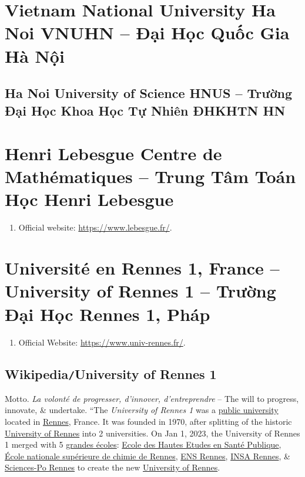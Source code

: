 \documentclass{article}
\begin{document}
\section{Vietnam National University Ha Noi VNUHN -- Đại Học Quốc Gia Hà Nội}

\subsection{Ha Noi University of Science HNUS -- Trường Đại Học Khoa Học Tự Nhiên ĐHKHTN HN}


\section{Henri Lebesgue Centre de Math\'ematiques -- Trung Tâm Toán Học Henri Lebesgue}
\begin{enumerate}
	\item Official website: \url{https://www.lebesgue.fr/}.
\end{enumerate}


\section{Universit\'e en Rennes 1, France -- University of Rennes 1 -- Trường Đại Học Rennes 1, Pháp}
\begin{enumerate}
	\item Official Website: \url{https://www.univ-rennes.fr/}.
\end{enumerate}

\subsection{Wikipedia{\tt/}University of Rennes 1}
{\sf Motto.} {\it La volonté de progresser, d'innover, d'entreprendre} -- The will to progress, innovate, \& undertake. ``The {\it University of Rennes 1} was a \href{https://en.wikipedia.org/wiki/Public_university}{public university} located in \href{https://en.wikipedia.org/wiki/Rennes}{Rennes}, France. It was founded in 1970, after splitting of the historic \href{https://en.wikipedia.org/wiki/University_of_Rennes}{University of Rennes} into 2 universities. On Jan 1, 2023, the University of Rennes 1 merged with 5 \href{https://en.wikipedia.org/wiki/Grandes_%C3%A9coles}{grandes \'ecoles}: \href{https://en.wikipedia.org/wiki/EHESP}{Ecole des Hautes Etudes en Sant\'e Publique}, \href{https://en.wikipedia.org/wiki/%C3%89cole_nationale_sup%C3%A9rieure_de_chimie_de_Rennes}{\'Ecole nationale sup\'erieure de chimie de Rennes}, \href{https://en.wikipedia.org/wiki/ENS_Rennes}{ENS Rennes}, \href{https://en.wikipedia.org/wiki/INSA_Rennes}{INSA Rennes}, \& \href{https://en.wikipedia.org/wiki/Institut_d%27%C3%A9tudes_politiques_de_Rennes}{Sciences-Po Rennes} to create the new \href{https://en.wikipedia.org/wiki/University_of_Rennes}{University of Rennes}.
\end{document}
